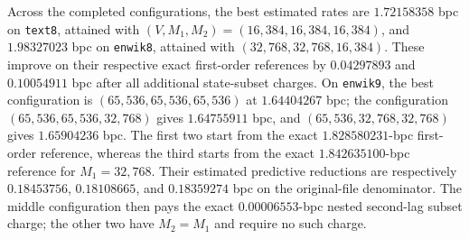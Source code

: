 \documentclass[11pt]{article}
\begin{document}
Across the completed configurations, the best estimated rates are
$1.72158358$ bpc on \texttt{text8}, attained with
$(V,M_1,M_2)=(16{,}384,16{,}384,16{,}384)$, and $1.98327023$ bpc on
\texttt{enwik8}, attained with
$(32{,}768,32{,}768,16{,}384)$.  These improve on their respective exact
first-order references by $0.04297893$ and $0.10054911$ bpc after all
additional state-subset charges.  On \texttt{enwik9}, the best
configuration is $(65{,}536,65{,}536,65{,}536)$ at $1.64404267$ bpc; the
configuration $(65{,}536,65{,}536,32{,}768)$ gives $1.64755911$ bpc, and
$(65{,}536,32{,}768,32{,}768)$ gives $1.65904236$ bpc.  The first two start
from the exact $1.828580231$-bpc first-order reference, whereas the third
starts from the exact $1.842635100$-bpc reference for $M_1=32{,}768$.
Their estimated predictive reductions are respectively $0.18453756$,
$0.18108665$, and $0.18359274$ bpc on the original-file denominator.  The
middle configuration then pays the exact $0.00006553$-bpc nested second-lag
subset charge; the other two have $M_2=M_1$ and require no such charge.
\end{document}
